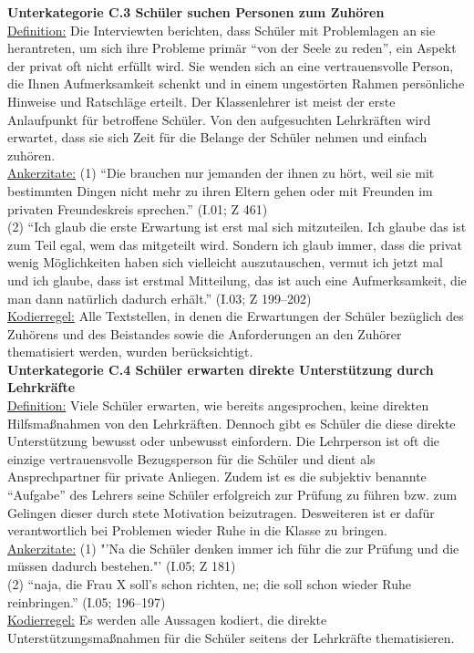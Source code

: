 \textbf{Unterkategorie C.3 Schüler suchen Personen zum Zuhören}\\
\underline{Definition:} Die Interviewten berichten, dass Schüler mit Problemlagen an sie herantreten, um sich ihre Probleme primär "`von der Seele zu reden"', ein Aspekt der privat oft nicht erfüllt wird. Sie wenden sich an eine vertrauensvolle Person, die Ihnen Aufmerksamkeit schenkt und in einem ungestörten Rahmen persönliche Hinweise und Ratschläge erteilt. Der Klassenlehrer ist meist der erste Anlaufpunkt für betroffene Schüler. Von den aufgesuchten Lehrkräften wird erwartet, dass sie sich Zeit für die Belange der Schüler nehmen und einfach zuhören.\\
\underline{Ankerzitate:} (1) "`Die brauchen nur jemanden der ihnen zu hört, weil sie mit bestimmten Dingen nicht mehr zu ihren Eltern gehen oder mit Freunden im privaten Freundeskreis sprechen."' (I.01; Z 461)\\ (2) "`Ich glaub die erste Erwartung ist erst mal sich mitzuteilen. Ich glaube das ist zum Teil egal, wem das mitgeteilt wird. Sondern ich glaub immer, dass die privat wenig Möglichkeiten haben sich vielleicht auszutauschen, vermut ich jetzt mal und ich glaube, dass ist erstmal Mitteilung, das ist auch eine Aufmerksamkeit, die man dann natürlich dadurch erhält."' (I.03; Z 199--202)\\
\underline{Kodierregel:} Alle Textstellen, in denen die Erwartungen der Schüler bezüglich des Zuhörens und des Beistandes sowie die Anforderungen an den Zuhörer thematisiert werden, wurden berücksichtigt.\\

\textbf{Unterkategorie C.4 Schüler erwarten direkte Unterstützung durch Lehrkräfte}\\
\underline{Definition:} Viele Schüler erwarten, wie bereits angesprochen, keine direkten Hilfsmaßnahmen von den Lehrkräften. Dennoch gibt es Schüler die diese direkte Unterstützung bewusst oder unbewusst einfordern. Die Lehrperson ist oft die einzige vertrauensvolle Bezugsperson für die Schüler und dient als Ansprechpartner für private Anliegen. Zudem ist es die subjektiv benannte "`Aufgabe"' des Lehrers seine Schüler erfolgreich zur Prüfung zu führen bzw. zum Gelingen dieser durch stete Motivation beizutragen. Desweiteren ist er dafür verantwortlich bei Problemen wieder Ruhe in die Klasse zu bringen.\\
\underline{Ankerzitate:} (1) "'Na die Schüler denken immer ich führ die zur Prüfung und die müssen dadurch bestehen."' (I.05; Z 181)\\ (2) "`naja, die Frau X soll's schon richten, ne; die soll schon wieder Ruhe reinbringen."' (I.05; 196--197)\\
\underline{Kodierregel:} Es werden alle Aussagen kodiert, die direkte Unterstützungsmaßnahmen für die Schüler seitens der Lehrkräfte thematisieren.\\

